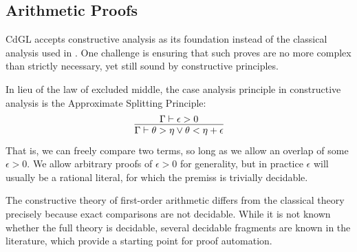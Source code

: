 \documentclass[12pt]{cmuthesis}
\theoremstyle{definition}
\theoremstyle{remark}
\newcommand{\CdGL}{\textsf{CdGL}\xspace}
\begin{document}
\subsection{Arithmetic Proofs}
\CdGL accepts constructive analysis as its foundation instead of the classical analysis used in \dGL.
One challenge is ensuring that such proves are no more complex than strictly necessary, yet still sound by constructive principles.

In lieu of the law of excluded middle, the case analysis principle in constructive analysis is the Approximate Splitting Principle:
\[\infer{\Gamma \vdash \theta > \eta \lor \theta < \eta + \epsilon}{\Gamma \vdash \epsilon > 0}\]
That is, we can freely compare two terms, so long as we allow an overlap of some $\epsilon > 0$.
We allow arbitrary proofs of $\epsilon > 0$ for generality, but in practice $\epsilon$ will usually be a rational literal, for which the premiss is trivially decidable.

The constructive theory of first-order arithmetic differs from the classical theory precisely because exact comparisons are not decidable.
While it is not known whether the full theory is decidable, several decidable fragments are known in the literature, which provide a starting point for proof automation.

\end{document}
